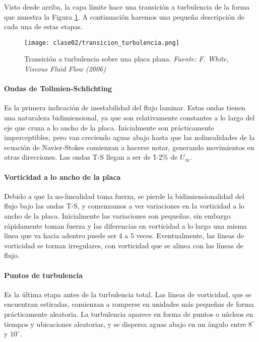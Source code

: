Visto desde arriba, la capa límite hace una transición a turbulencia de la forma que muestra la Figura \ref{fig:transicion_turbulencia}.
A continuación haremos una pequeña descripción de cada una de estas etapas.
%
\begin{figure}[h!]
\centering
\texttt{[image: clase02/transicion\_turbulencia.png]}
\caption{Transición a turbulencia sobre una placa plana. \emph{Fuente: F. White, Viscous Fluid Flow (2006)}}
\label{fig:transicion_turbulencia}
\end{figure}

\paragraph*{Ondas de Tollmien-Schlichting}
Es la primera indicación de inestabilidad del flujo laminar. 
Estas ondas tienen una naturaleza bidimiensional, ya que son relativamente constantes a lo largo del eje que cruza a lo ancho de la placa.
Inicialmente son prácticamente imperceptibles, pero van creciendo aguas abajo hasta que las nolinealidades de la ecuación de Navier-Stokes comienzan a hacerse notar, generando movimientos en otras direcciones.
Las ondas T-S llegan a ser de \~1-2\% de $U_\infty$.

\paragraph*{Vorticidad a lo ancho de la placa}
Debido a que la no-linealidad toma fuerza, se pierde la bidimiensionalidad del flujo bajo las ondas T-S, y comenzamos a ver variaciones en la vorticidad a lo ancho de la placa.
Inicialmente las variaciones son pequeñas, sin embargo rápidamente toman fuerza y las diferencias en vorticidad a lo largo una misma línea que va hacia adentro puede ser 4 a 5 veces.
Eventualmente, las líneas de vorticidad se tornan irregulares, con vorticidad que se alinea con las líneas de flujo.

\paragraph*{Puntos de turbulencia}
Es la última etapa antes de la turbulencia total.
Las líneas de vorticidad, que se encuentran estiradas, comienzan a romperse en unidades más pequeñas de forma prácticamente aleatoria. 
La turbulencia aparece en forma de puntos o núcleos en tiempos y ubicaciones aleatorias, y se dispersa aguas abajo en un ángulo entre $8^\circ$ y $10^\circ$.

